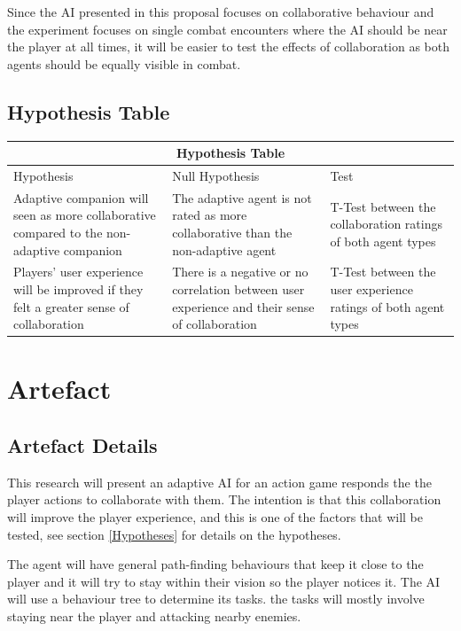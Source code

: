 \documentclass{IEEEtran}
\begin{document}
Since the AI presented in this proposal focuses on collaborative behaviour and the experiment focuses on single combat encounters where the AI should be near the player at all times, it will be easier to test the effects of collaboration as both agents should be equally visible in combat. 

\subsection{Hypothesis Table}

\begin{tabular}{ |p{3cm}|p{3cm}|p{2cm}|  }
 \hline
 \multicolumn{3}{|c|}{Hypothesis Table} \\
 \hline
 Hypothesis & Null Hypothesis & Test\\
 \hline
    Adaptive companion will seen as more collaborative compared to the non-adaptive companion & 
    The adaptive agent is not rated as more collaborative than the non-adaptive agent &
    T-Test between the collaboration ratings of both agent types \\
 \hline
    Players' user experience will be improved if they felt a greater sense of collaboration & 
    There is a negative or no correlation between user experience and their sense of collaboration &
    T-Test between the user experience ratings of both agent types\\
 \hline
\end{tabular}

\section{Artefact}
\label{Artefact}

\subsection{Artefact Details}
\label{ArtefactDetails}

This research will present an adaptive AI for an action game responds the the player actions to collaborate with them. The intention is that this collaboration will improve the player experience, and this is one of the factors that will be tested, see section \ref{Hypotheses} for details on the hypotheses.

The agent will have general path-finding behaviours that keep it close to the player and it will try to stay within their vision so the player notices it. The AI will use a behaviour tree to determine its tasks. the tasks will mostly involve staying near the player and attacking nearby enemies.
\end{document}
